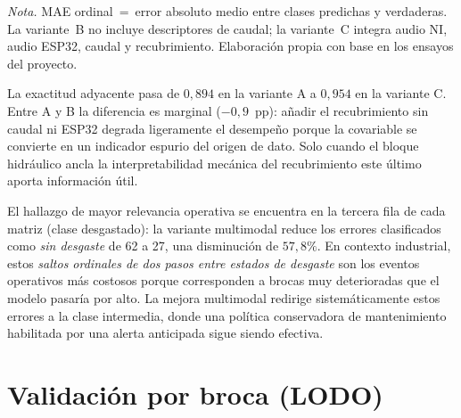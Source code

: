 \documentclass[12pt, letterpaper]{report}
\begin{document}
\begin{table}[h]
\centering
\caption{\textit{Desempeño comparativo de las variantes del clasificador
SVM sobre la retención E3 ($n=583$).}}
\label{tab:ablacion-e3}
\renewcommand{\arraystretch}{1.15}

\vspace{0.4em}
\footnotesize\textit{Nota.} MAE ordinal~=~error absoluto medio entre clases predichas
y verdaderas. La variante~B no incluye descriptores de caudal; la variante~C
integra audio NI, audio ESP32, caudal y recubrimiento. Elaboración propia con
base en los ensayos del proyecto.
\end{table}

La exactitud adyacente pasa de $0{,}894$ en la variante A a $0{,}954$ en
la variante C. Entre A y B la diferencia es marginal ($-0{,}9$~pp):
añadir el recubrimiento sin caudal ni ESP32 degrada ligeramente el
desempeño porque la covariable se convierte en un indicador espurio del
origen de dato. Solo cuando el bloque hidráulico ancla la
interpretabilidad mecánica del recubrimiento este último aporta
información útil.

El hallazgo de mayor relevancia operativa se encuentra en la tercera
fila de cada matriz (clase desgastado): la variante multimodal reduce
los errores clasificados como \emph{sin desgaste} de 62 a 27, una
disminución de $57{,}8\%$. En contexto industrial, estos
\emph{saltos ordinales de dos pasos entre estados de desgaste} son los
eventos operativos más costosos porque corresponden a brocas muy
deterioradas que el modelo pasaría por alto. La mejora multimodal
redirige sistemáticamente estos errores a la clase intermedia, donde una
política conservadora de mantenimiento habilitada por una alerta
anticipada sigue siendo efectiva.

\section{Validación por broca (LODO)}
\label{sec:lodo}
\end{document}

